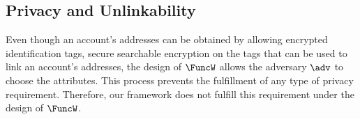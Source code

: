 \subsection{Privacy and Unlinkability}

Even though an account's addresses can be obtained by allowing encrypted identification tags, \ie secure searchable encryption on the tags that can be used to link an account's addresses, the design of $\FuncW$ allows the adversary $\adv$ to choose the attributes. This process prevents the fulfillment of any type of privacy requirement. Therefore, our framework does not fulfill this requirement under the design of $\FuncW$.
%
%
%
